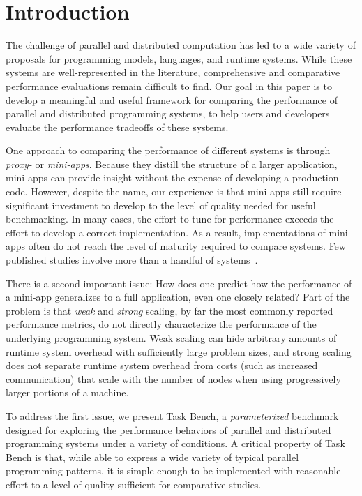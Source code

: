 \section{Introduction}
\label{sec:introduction}

The challenge of parallel and distributed computation has led to a
wide variety of proposals for programming models, languages, and
runtime systems. While these systems are well-represented in the literature, comprehensive and comparative performance evaluations
remain difficult to find. Our
goal in this paper is to develop a meaningful and useful framework for
comparing the performance of parallel and distributed programming
systems, to help users and developers evaluate the performance tradeoffs of these systems.

One approach to comparing the performance of different systems is through \emph{proxy-} or
\emph{mini-apps}. Because they distill the structure of a larger
application, mini-apps can provide insight
without the expense of developing a production code. However, despite the name, our experience is that
mini-apps still require significant investment to develop
to the level of quality needed for useful benchmarking. In many cases,
the effort to tune for performance exceeds the effort to develop a correct implementation. As a result, implementations of mini-apps
often do not reach the level of maturity required to compare
systems. Few published studies involve more than a handful of systems~\cite{LULESH13}.

There is a second important issue: How does one predict how
the performance of a mini-app generalizes to a full
application, even one closely related? Part of the problem is
that \emph{weak} and \emph{strong} scaling, by far the most commonly
reported performance metrics,
do not directly characterize the performance of the underlying
programming system. Weak scaling can hide arbitrary amounts of runtime
system overhead with sufficiently large problem sizes, and strong
scaling does not separate runtime system overhead from costs
(such as increased communication) that scale with the number of nodes when
using progressively larger portions of a machine.

To address the first issue, we present Task Bench, a
\emph{parameterized} benchmark designed for exploring the performance
behaviors of parallel and distributed programming systems under a
variety of conditions. A critical property of Task Bench is that,
while able to express a wide variety of typical parallel programming
patterns, it is simple enough to be implemented with reasonable effort
to a level of quality sufficient for comparative studies.

